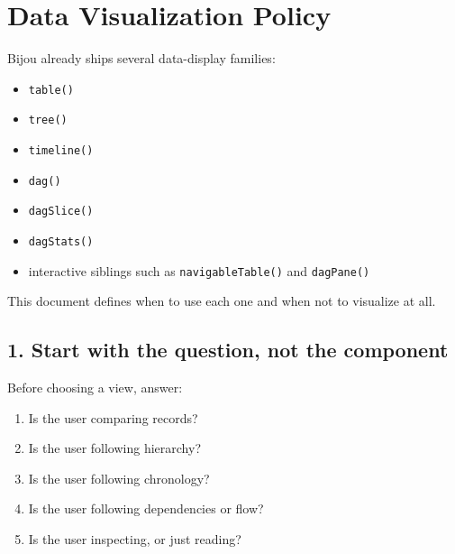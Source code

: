 \chapter{Data Visualization Policy}\label{record-020}

\smallskip

Bijou already ships several data-display families:

\begin{itemize}
\tightlist
\item
  \texttt{t\allowbreak{}a\allowbreak{}b\allowbreak{}l\allowbreak{}e\allowbreak{}(\allowbreak{})}
\item
  \texttt{t\allowbreak{}r\allowbreak{}e\allowbreak{}e\allowbreak{}(\allowbreak{})}
\item
  \texttt{t\allowbreak{}i\allowbreak{}m\allowbreak{}e\allowbreak{}l\allowbreak{}i\allowbreak{}n\allowbreak{}e\allowbreak{}(\allowbreak{})}
\item
  \texttt{d\allowbreak{}a\allowbreak{}g\allowbreak{}(\allowbreak{})}
\item
  \texttt{d\allowbreak{}a\allowbreak{}g\allowbreak{}S\allowbreak{}l\allowbreak{}i\allowbreak{}c\allowbreak{}e\allowbreak{}(\allowbreak{})}
\item
  \texttt{d\allowbreak{}a\allowbreak{}g\allowbreak{}S\allowbreak{}t\allowbreak{}a\allowbreak{}t\allowbreak{}s\allowbreak{}(\allowbreak{})}
\item
  interactive siblings such as \texttt{n\allowbreak{}a\allowbreak{}v\allowbreak{}i\allowbreak{}g\allowbreak{}a\allowbreak{}b\allowbreak{}l\allowbreak{}e\allowbreak{}T\allowbreak{}a\allowbreak{}b\allowbreak{}l\allowbreak{}e\allowbreak{}(\allowbreak{})} and \texttt{d\allowbreak{}a\allowbreak{}g\allowbreak{}P\allowbreak{}a\allowbreak{}n\allowbreak{}e\allowbreak{}(\allowbreak{})}
\end{itemize}

This document defines when to use each one and when not to visualize at all.

\section{1. Start with the question, not the component}\label{record-020-start-with-the-question-not-the-component}

Before choosing a view, answer:

\begin{enumerate}
\def\labelenumi{\arabic{enumi}.}
\tightlist
\item
  Is the user comparing records?
\item
  Is the user following hierarchy?
\item
  Is the user following chronology?
\item
  Is the user following dependencies or flow?
\item
  Is the user inspecting, or just reading?
\end{enumerate}


